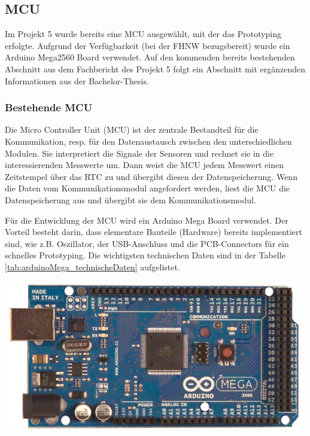 \subsection{MCU}
\label{subsec:MCU}
Im Projekt 5 wurde bereits eine MCU ausgewählt, mit der das Prototyping erfolgte. Aufgrund der Verfügbarkeit (bei der FHNW bezugsbereit) wurde ein Arduino Mega2560 Board verwendet. Auf den kommenden bereits bestehenden Abschnitt aus dem Fachbericht des Projekt 5 folgt ein Abschnitt mit ergänzenden Informationen aus der Bachelor-Thesis.

\subsubsection{Bestehende MCU}
Die Micro Controller Unit (MCU) ist der zentrale Bestandteil für die Kommunikation, resp. für den Datenaustausch zwischen den unterschiedlichen Modulen. Sie interpretiert die Signale der Sensoren und rechnet sie in die interessierenden Messwerte um. Dann weist die MCU jedem Messwert einen Zeitstempel über das RTC zu und übergibt diesen der Datenspeicherung. Wenn die Daten vom Kommunikationsmodul angefordert werden, liest die MCU die Datenspeicherung aus und übergibt sie dem Kommunikationsmodul.\\

{\begin{minipage}[b][130pt][t]{0.5\textwidth}
Für die Entwicklung der MCU wird ein Arduino Mega Board verwendet. Der Vorteil besteht darin, dass elementare Bauteile (Hardware) bereits implementiert sind, wie z.B. Oszillator, der USB-Anschluss und die PCB-Connectors für ein schnelles Prototyping. Die wichtigsten technischen Daten sind in der Tabelle \ref{tab:arduinoMega_technischeDaten} aufgelistet.\\
\end{minipage}}
\hfill
{\begin{minipage}[b][130pt][t]{0.49\textwidth}
\centering
\includegraphics[width=0.99\textwidth]{graphics/MCU/arduino_mega.png}
\label{fig:arduinoMega}
\end{minipage}}


